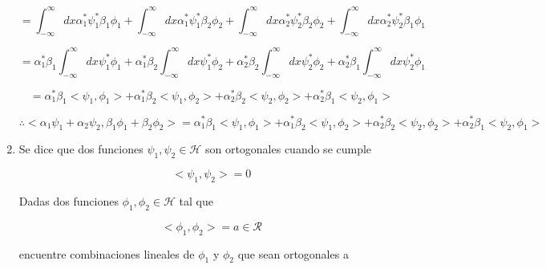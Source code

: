 \documentclass[12pt,a4paper]{article}
\begin{document}
\begin{enumerate}
    \begin{equation*}
        = \int_{-\infty}^{\infty} dx \alpha_1^* \psi_1^* \beta_1 \phi_1 +  \int_{-\infty}^{\infty} dx \alpha_1^* \psi_1^* \beta_2 \phi_2 +  \int_{-\infty}^{\infty} dx \alpha_2^* \psi_2^*  \beta_2 \phi_2 + \int_{-\infty}^{\infty} dx \alpha_2^* \psi_2^* \beta_1 \phi_1
    \end{equation*}
    
    \begin{equation*}
        = \alpha_1^* \beta_1 \int_{-\infty}^{\infty} dx  \psi_1^*  \phi_1 + \alpha_1^*  \beta_2 \int_{-\infty}^{\infty} dx  \psi_1^*  \phi_2 +  \alpha_2^* \beta_2 \int_{-\infty}^{\infty} dx  \psi_2^*   \phi_2 + \alpha_2^* \beta_1\int_{-\infty}^{\infty} dx  \psi_2^*  \phi_1
    \end{equation*}
    
    \begin{equation*}
        = \alpha_1^* \beta_1 <\psi_1,  \phi_1> + \alpha_1^*  \beta_2 <\psi_1,  \phi_2> +  \alpha_2^* \beta_2 <\psi_2, \phi_2> + \alpha_2^* \beta_1 <\psi_2,  \phi_1>
    \end{equation*}
    
    \begin{equation*}
        \therefore <\alpha_1 \psi_1 + \alpha_2 \psi_2, \beta_1 \phi_1 + \beta_2 \phi_2 > =  \alpha_1^* \beta_1 <\psi_1,  \phi_1> + \alpha_1^*  \beta_2 <\psi_1,  \phi_2> +  \alpha_2^* \beta_2 <\psi_2, \phi_2> + \alpha_2^* \beta_1 <\psi_2,  \phi_1>
    \end{equation*}
    
    
    
    
    
    
    \item Se dice que dos funciones $\psi_1, \psi_2 \in \mathcal{H}$ son ortogonales cuando se cumple
    
    \begin{equation*}
        <\psi_1, \psi_2> = 0
    \end{equation*}
    
    Dadas dos funciones  $\phi_1 , \phi_2 \in \mathcal{H} $ tal que
    
    \begin{equation*}
        <\phi_1, \phi_2> = a \in \mathcal{R}
    \end{equation*}
    
    encuentre combinaciones lineales de $\phi_1$ y $\phi_2$ que sean ortogonales a 
    

\end{enumerate}
\end{document}
